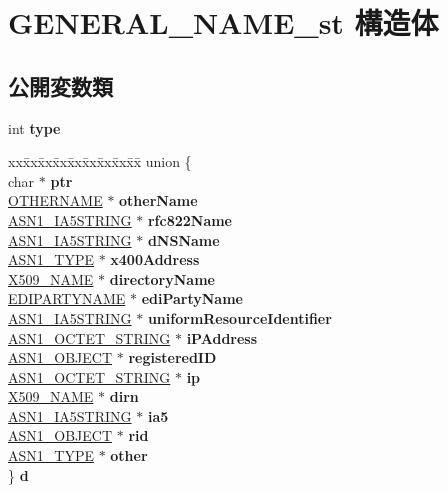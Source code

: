 \hypertarget{struct_g_e_n_e_r_a_l___n_a_m_e__st}{}\section{G\+E\+N\+E\+R\+A\+L\+\_\+\+N\+A\+M\+E\+\_\+st 構造体}
\label{struct_g_e_n_e_r_a_l___n_a_m_e__st}
\subsection*{公開変数類}
\begin{DoxyCompactItemize}
\item 
\hypertarget{struct_g_e_n_e_r_a_l___n_a_m_e__st_adee285a4ad25557f12d51af03e1cf0e2}{}int {\bfseries type}\label{struct_g_e_n_e_r_a_l___n_a_m_e__st_adee285a4ad25557f12d51af03e1cf0e2}

\item 
\hypertarget{struct_g_e_n_e_r_a_l___n_a_m_e__st_a44d86c34c6dbf104daae3b2c56836617}{}\begin{tabbing}
xx\=xx\=xx\=xx\=xx\=xx\=xx\=xx\=xx\=\kill
union \{\\
\>char $\ast$ {\bfseries ptr}\\
\>\hyperlink{structother_name__st}{OTHERNAME} $\ast$ {\bfseries otherName}\\
\>\hyperlink{structasn1__string__st}{ASN1\_IA5STRING} $\ast$ {\bfseries rfc822Name}\\
\>\hyperlink{structasn1__string__st}{ASN1\_IA5STRING} $\ast$ {\bfseries dNSName}\\
\>\hyperlink{structasn1__type__st}{ASN1\_TYPE} $\ast$ {\bfseries x400Address}\\
\>\hyperlink{struct_x509__name__st}{X509\_NAME} $\ast$ {\bfseries directoryName}\\
\>\hyperlink{struct_e_d_i_party_name__st}{EDIPARTYNAME} $\ast$ {\bfseries ediPartyName}\\
\>\hyperlink{structasn1__string__st}{ASN1\_IA5STRING} $\ast$ {\bfseries uniformResourceIdentifier}\\
\>\hyperlink{structasn1__string__st}{ASN1\_OCTET\_STRING} $\ast$ {\bfseries iPAddress}\\
\>\hyperlink{structasn1__object__st}{ASN1\_OBJECT} $\ast$ {\bfseries registeredID}\\
\>\hyperlink{structasn1__string__st}{ASN1\_OCTET\_STRING} $\ast$ {\bfseries ip}\\
\>\hyperlink{struct_x509__name__st}{X509\_NAME} $\ast$ {\bfseries dirn}\\
\>\hyperlink{structasn1__string__st}{ASN1\_IA5STRING} $\ast$ {\bfseries ia5}\\
\>\hyperlink{structasn1__object__st}{ASN1\_OBJECT} $\ast$ {\bfseries rid}\\
\>\hyperlink{structasn1__type__st}{ASN1\_TYPE} $\ast$ {\bfseries other}\\
\} {\bfseries d}\label{struct_g_e_n_e_r_a_l___n_a_m_e__st_a44d86c34c6dbf104daae3b2c56836617}
\\

\end{tabbing}\end{DoxyCompactItemize}


